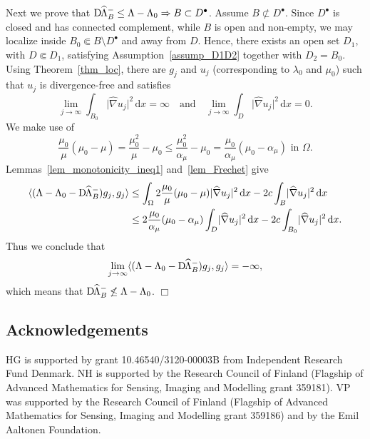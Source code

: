\documentclass[reqno]{amsart}
\numberwithin{equation}{section}
\numberwithin{figure}{section}
\numberwithin{table}{section}
\newcommand{\abs}[1]{\lvert#1\rvert}
\newcommand{\inner}[1]{\langle#1\rangle}
\newcommand{\di}{\mathrm{d}}
\newcommand{\DhLambda}{\textup{D}\mkern-1.5mu \widehat{\Lambda}}
\theoremstyle{definition}
\theoremstyle{plain}
\theoremstyle{definition}
\theoremstyle{remark}
\numberwithin{equation}{section}
\begin{document}
Next we prove that $\DhLambda^-_B \leq \Lambda - \Lambda_0 \Rightarrow B\subset D^\bullet$. Assume $B\not\subset D^\bullet$. Since $D^\bullet$ is closed and has connected complement, while $B$ is open and non-empty, we may localize inside $B_0 \Subset B \setminus D^\bullet$ and away from $D$. Hence, there exists an open set $D_1$, with $D\Subset D_1$, satisfying Assumption~\ref{assump_D1D2} together with $D_2 = B_0$. Using Theorem~\ref{thm_loc}, there are $g_j$ and $u_j$ (corresponding to $\lambda_0$ and $\mu_0$) such that $u_j$ is divergence-free and satisfies
%
\begin{equation*}
	\lim_{j\to\infty}\int_{B_0} \abs{\widehat{\nabla}u_j}^2\,\di x = \infty \quad \text{and}\quad \lim_{j\to\infty}\int_{D} \abs{\widehat{\nabla}u_j}^2\,\di x = 0.
\end{equation*}
%
We make use of
%
\begin{equation*}
	\frac{\mu_0}{\mu}(\mu_0 - \mu) = \frac{\mu_0^2}{\mu}-\mu_0 \leq \frac{\mu_0^2}{\alpha_\mu}-\mu_0 = \frac{\mu_0}{\alpha_\mu}(\mu_0 - \alpha_\mu) \text{ in } \Omega.
\end{equation*} 
%
Lemmas~\ref{lem_monotonicity_ineq1} and~\ref{lem_Frechet} give
%
\begin{align*}
	\inner{(\Lambda-\Lambda_0-\DhLambda_B^-)g_j,g_j} &\leq \int_{\Omega} 2\frac{\mu_0}{\mu}(\mu_0 - \mu)\abs{\widehat{\nabla}u_j}^2\,\di x - 2c\int_B\abs{\widehat{\nabla}u_j}^2\,\di x \\
	&\leq 2\frac{\mu_0}{\alpha_\mu}(\mu_0 - \alpha_\mu)\int_{D}\abs{\widehat{\nabla}u_j}^2\,\di x - 2c\int_{B_0}\abs{\widehat{\nabla}u_j}^2\,\di x.
\end{align*}
%
Thus we conclude that
%
\begin{equation*}
	\lim_{j\to\infty}\inner{(\Lambda-\Lambda_0-\DhLambda_B^-)g_j,g_j} = -\infty,
\end{equation*}
%
which means that $\DhLambda_B^- \not\leq \Lambda-\Lambda_0$.
\hfill $\Box$

\subsection*{Acknowledgements}

HG is supported by grant 10.46540/3120-00003B from Independent Research Fund Denmark. NH is supported by the Research Council of Finland (Flagship of Advanced Mathematics for Sensing, Imaging and Modelling grant 359181).
VP was supported by the Research Council of Finland (Flagship of Advanced Mathematics for Sensing, Imaging and Modelling grant 359186)
and by the Emil Aaltonen Foundation.
\end{document}

